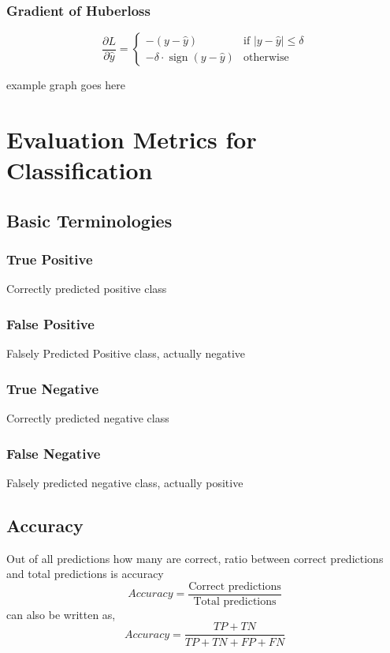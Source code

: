 \documentclass[12pt]{extarticle}
\begin{document}
\subsubsection{Gradient of Huberloss}

\[
\frac{\partial L}{\partial \hat{y}} =
\begin{cases}
-(y - \hat{y}) & \text{if } |y - \hat{y}| \leq \delta \\
-\delta \cdot \operatorname{sign}(y - \hat{y}) & \text{otherwise}
\end{cases}
\]

example graph goes here

\section{Evaluation Metrics for Classification}

\subsection{Basic Terminologies}

\subsubsection*{True Positive}
Correctly predicted positive class

\subsubsection*{False Positive}
Falsely Predicted Positive class, actually negative

\subsubsection*{True Negative}
Correctly predicted negative class

\subsubsection*{False Negative}
Falsely predicted negative class, actually positive 

\subsection{Accuracy}
Out of all predictions how many are correct, 
ratio between correct predictions and total predictions is accuracy
$$ Accuracy = \frac{\text{Correct predictions}} {\text{Total predictions}} $$
can also be written as,
$$ Accuracy = \frac{TP+TN}{TP+TN+FP+FN}  $$
\end{document}
